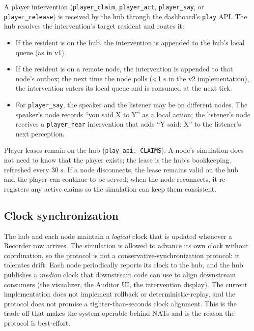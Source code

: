 A player intervention (\texttt{player\_claim}, \texttt{player\_act},
\texttt{player\_say}, or \texttt{player\_release}) is received by the
hub through the dashboard's \texttt{play} API.  The hub resolves the
intervention's target resident and routes it:

\begin{itemize}[leftmargin=*]
  \item If the resident is on the hub, the intervention is appended to
  the hub's local queue (as in v1).
  \item If the resident is on a remote node, the intervention is
  appended to that node's outbox; the next time the node polls
  (\textless 1 s in the v2 implementation), the intervention enters its
  local queue and is consumed at the next tick.
  \item For \texttt{player\_say}, the speaker and the listener may be on
  different nodes.  The speaker's node records ``you said X to Y'' as
  a local action; the listener's node receives a \texttt{player\_hear}
  intervention that adds ``Y said: X'' to the listener's next
  perception.
\end{itemize}

Player leases remain on the hub (\texttt{play\_api.\_CLAIMS}).  A
node's simulation does not need to know that the player exists; the
lease is the hub's bookkeeping, refreshed every 30 s.  If a node
disconnects, the lease remains valid on the hub and the player can
continue to be served; when the node reconnects, it re-registers any
active claims so the simulation can keep them consistent.

\subsection{Clock synchronization}

The hub and each node maintain a \emph{logical} clock that is updated
whenever a Recorder row arrives.  The simulation is allowed to advance
its own clock without coordination, so the protocol is not a
conservative-synchronization protocol: it tolerates drift.  Each node
periodically reports its clock to the hub, and the hub publishes a
\emph{median} clock that downstream code can use to align downstream
consumers (the visualizer, the Auditor UI, the intervention display).
The current implementation does not implement rollback or
deterministic-replay, and the protocol does not promise a
tighter-than-seconds clock alignment.  This is the trade-off that
makes the system operable behind NATs and is the reason the protocol
is best-effort.

